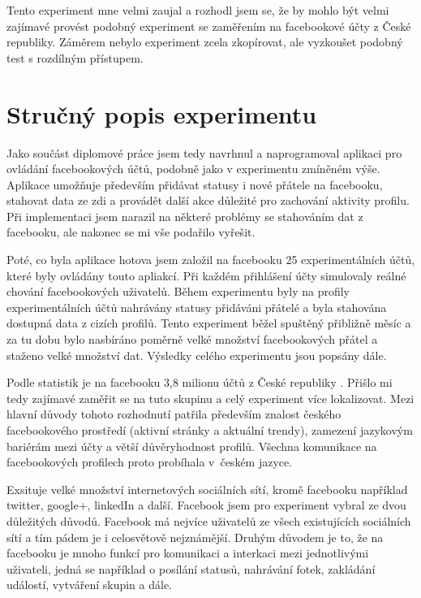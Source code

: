 \documentclass[thesis=M,czech]{FITthesis}[2013/05/10]
\begin{document}
Tento experiment mne velmi zaujal a rozhodl jsem se, že by mohlo být velmi zajímavé provést podobný experiment se zaměřením na facebookové účty z České republiky. Záměrem nebylo experiment zcela zkopírovat, ale vyzkoušet podobný test s rozdílným přístupem. 

\section{Stručný popis experimentu}

Jako součást diplomové práce jsem tedy navrhnul a naprogramoval aplikaci pro ovládání facebookových účtů, podobně jako v experimentu zmíněném výše. Aplikace umožňuje především přidávat statusy i nové přátele na facebooku, stahovat data ze zdi a provádět další akce důležité pro zachování aktivity profilu. Při implementaci jsem narazil na některé problémy se stahováním dat z facebooku, ale nakonec se mi vše podařilo vyřešit.

Poté, co byla aplikace hotova jsem založil na facebooku 25 experimentálních účtů, které byly ovládány touto apliakcí. Při každém přihlášení účty simulovaly reálné chování facebookových uživatelů. Během experimentu byly na profily experimentálních účtů nahrávány statusy přidáváni přátelé a byla stahována dostupná data z cizích profilů. Tento experiment běžel spuštěný přibližně měsíc a za tu dobu bylo nasbíráno poměrně velké množství facebookových přátel a staženo velké množství dat. Výsledky celého experimentu jsou popsány dále.

Podle statistik je na facebooku 3,8 milionu účtů z České republiky \cite{web:fbCzechUsers}. Přišlo mi tedy zajímavé zaměřit se na tuto skupinu a celý experiment více lokalizovat. Mezi hlavní důvody tohoto rozhodnutí patřila především znalost českého facebookového prostředí (aktivní stránky a aktuální trendy), zamezení jazykovým bariérám mezi účty a větší důvěryhodnost profilů. Všechna komunikace na facebookových profilech proto probíhala v~českém jazyce.

Exsituje velké množství internetových sociálních sítí, kromě facebooku například twitter, google+, linkedIn a další. Facebook jsem pro experiment vybral ze dvou důležitých důvodů. Facebook má nejvíce uživatelů ze všech existujících sociálních sítí a tím pádem je i celosvětově nejznámější. Druhým důvodem je to, že na facebooku je mnoho funkcí pro komunikaci a interkaci mezi jednotlivými uživateli, jedná se například o posílání statusů, nahrávání fotek, zakládání událostí, vytváření skupin a dále.
\end{document}
